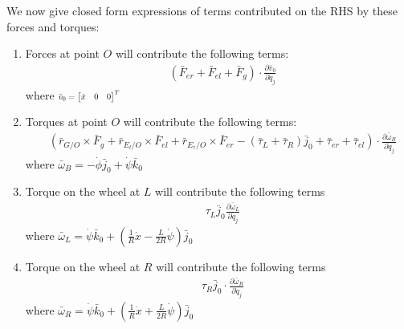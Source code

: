 \documentclass[a4paper,10pt]{article}
\newcommand\scalemath[2]{\scalebox{#1}{\mbox{\ensuremath{\displaystyle #2}}}}
\begin{document}
\vspace{5mm}

We now give closed form expressions of terms contributed on the RHS by these forces and torques:

\vspace{5mm} 
\begin{enumerate}
 \item Forces at point $O$ will contribute the following terms:
\begin{align}
 &\left( \bar{F}_{er} + \bar{F}_{el} + \bar{F}_g  \right) \cdot \frac{\partial \bar{v}_0}{\partial \dot{q}_j}
\end{align}
where $\scalemath{0.75}{\bar{v}_{0} = \left[\begin{matrix} \dot{x} & 0 & 0 \end{matrix}\right]^T}$

\vspace{5mm}

 \item Torques at point $O$ will contribute the following terms:
\begin{align}
  &\left(\bar{r}_{G/O} \times \bar{F}_g + \bar{r}_{E_l/O} \times \bar{F}_{el} + \bar{r}_{E_r/O} \times \bar{F}_{er} 
  - \left(\bar\tau_L + \bar\tau_R\right)\bar{j}_0 + \bar\tau_{er} + \bar\tau_{el}\right) \cdot \frac{\partial \bar{\omega}_B}{\partial \dot{q}_j}
\end{align}
where $\bar{\omega}_B = - \dot\phi\bar{j}_0 + \dot\psi\bar{k}_0$

\vspace{5mm}

 \item Torque on the wheel at $L$ will contribute the following terms
\begin{align}
 & \tau_L\bar{j}_0  \frac{\partial \bar{\omega}_L}{\partial \dot{q}_j}
\end{align}
where $\bar{\omega}_L = \dot\psi\bar{k}_0 + \left(\frac{1}{R}\dot{x}-\frac{L}{2R}\dot\psi\right)\bar{j}_0$

\vspace{5mm}

 \item Torque on the wheel at $R$ will contribute the following terms
\begin{align}
 & \tau_R\bar{j}_0 \cdot \frac{\partial \bar{\omega}_R}{\partial \dot{q}_j}
\end{align}
where $\bar{\omega}_R = \dot\psi\bar{k}_0 + \left(\frac{1}{R}\dot{x}+\frac{L}{2R}\dot\psi\right)\bar{j}_0$
\end{enumerate}
\end{document}
